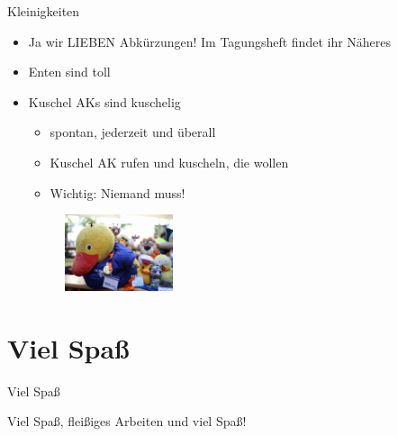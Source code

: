 \documentclass[compress,]{beamer}
\begin{document}
\begin{frame}{Kleinigkeiten}

\begin{itemize}[<+->]
	\item Ja wir LIEBEN Abkürzungen! Im Tagungsheft findet ihr Näheres
	\item Enten sind toll
	\item Kuschel AKs sind kuschelig
	\begin{itemize}
		\item spontan, jederzeit und überall
		\item Kuschel AK rufen und kuscheln, die wollen
		\item Wichtig: Niemand muss!
	\end{itemize}
	\begin{figure}
		\centering
		\includegraphics[width=0.3\textwidth]{Ente.pdf}
	\end{figure}
	
\end{itemize}
\end{frame}

\section{Viel Spaß}

\begin{frame}{Viel Spaß}

Viel Spaß, fleißiges Arbeiten und viel Spaß!

\end{frame}
\end{document}
